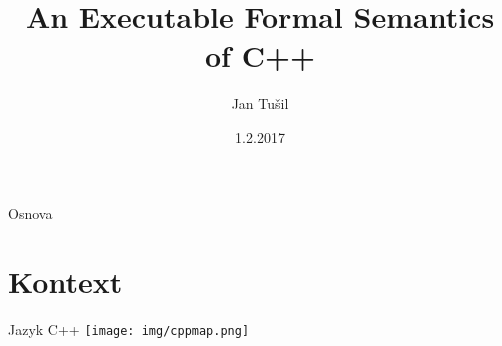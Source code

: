\documentclass[11pt]{beamer}
\author{Jan Tušil}
\title{An Executable Formal Semantics of C++}
\institute{FI MU}
\date{1.2.2017}
\begin{document}







\begin{frame}
\titlepage
\end{frame}

\begin{frame}{Osnova}
\tableofcontents
\end{frame}



\section{Kontext}

\begin{frame}{Jazyk C++}
\texttt{[image: img/cppmap.png]}
\end{frame}
\end{document}
